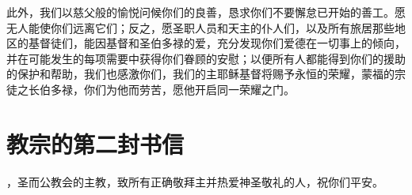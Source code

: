 此外，我们以慈父般的愉悦问候你们的良善，恳求你们不要懈怠已开始的善工。愿无人能使你们远离它们；反之，愿圣职人员和天主的仆人们，以及所有旅居那些地区的基督徒们，能因基督和圣伯多禄的爱，充分发现你们爱德在一切事上的倾向，并在可能发生的每项需要中获得你们眷顾的安慰；以便所有人都能得到你们的援助的保护和帮助，我们也感激你们，我们的主耶稣基督将赐予永恒的荣耀，蒙福的宗徒之长伯多禄，你们为他而劳苦，愿他开启同一荣耀之门。\par


\section{教宗的第二封书信}

\par

，圣而公教会的主教，致所有正确敬拜主并热爱神圣敬礼的人，祝你们平安。\par


